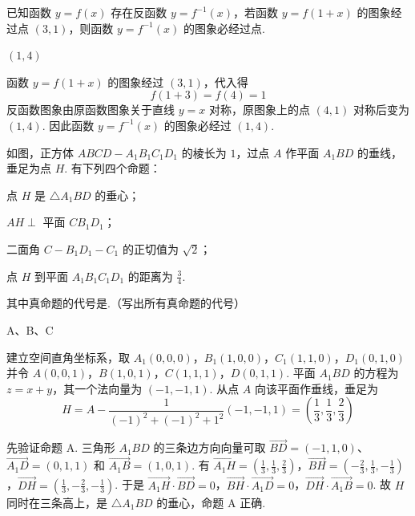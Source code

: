 \begin{problem}
已知函数 \( y = f(x) \) 存在反函数 \( y = f^{-1}(x) \)，若函数 \( y = f(1 + x) \) 的图象经过点 \((3,1)\)，则函数 \( y = f^{-1}(x) \) 的图象必经过点\fillinblank{}.

\begin{answer}
\((1,4)\)
\end{answer}

\begin{solution}
函数 \(y=f(1+x)\) 的图象经过 \((3,1)\)，代入得
\[
f(1+3)=f(4)=1
\]
反函数图象由原函数图象关于直线 \(y=x\) 对称，原图象上的点 \((4,1)\) 对称后变为 \((1,4)\). 因此函数 \(y=f^{-1}(x)\) 的图象必经过 \((1,4)\).
\end{solution}
\end{problem}

\begin{problem}
如图，正方体 \(ABCD-A_{1}B_{1}C_{1}D_{1}\) 的棱长为 \(1\)，过点 \(A\) 作平面 \(A_{1}BD\) 的垂线，垂足为点 \(H\). 有下列四个命题：

\begin{circlelist}
\item 点 \(H\) 是 \(\triangle A_{1}BD\) 的垂心；
\item \(AH \perp\) 平面 \(CB_{1}D_{1}\)；
\item 二面角 \(C - B_{1}D_{1} - C_{1}\) 的正切值为 \(\sqrt{2}\)；
\item 点 \(H\) 到平面 \(A_{1}B_{1}C_{1}D_{1}\) 的距离为 \(\frac{3}{4}\).
\end{circlelist}

其中真命题的代号是\fillinblank{}.（写出所有真命题的代号）


\begin{answer}
A、B、C
\end{answer}

\begin{solution}
建立空间直角坐标系，取
\(A_1(0,0,0)\)，\(B_1(1,0,0)\)，\(C_1(1,1,0)\)，\(D_1(0,1,0)\)
并令
\(A(0,0,1)\)，\(B(1,0,1)\)，\(C(1,1,1)\)，\(D(0,1,1)\).
平面 \(A_1BD\) 的方程为 \(z=x+y\)，其一个法向量为 \((-1,-1,1)\). 从点 \(A\) 向该平面作垂线，垂足为
\[
H=A-\frac{1}{(-1)^2+(-1)^2+1^2}(-1,-1,1)=\left(\frac{1}{3},\frac{1}{3},\frac{2}{3}\right)
\]

先验证命题 A. 三角形 \(A_1BD\) 的三条边方向向量可取 \(\overrightarrow{BD}=(-1,1,0)\)、\(\overrightarrow{A_1D}=(0,1,1)\) 和 \(\overrightarrow{A_1B}=(1,0,1)\). 有
\(\overrightarrow{A_1H}=\left(\frac{1}{3},\frac{1}{3},\frac{2}{3}\right)\)，\(\overrightarrow{BH}=\left(-\frac{2}{3},\frac{1}{3},-\frac{1}{3}\right)\)，\(\overrightarrow{DH}=\left(\frac{1}{3},-\frac{2}{3},-\frac{1}{3}\right)\).
于是
\(\overrightarrow{A_1H}\cdot\overrightarrow{BD}=0\)，\(\overrightarrow{BH}\cdot\overrightarrow{A_1D}=0\)，\(\overrightarrow{DH}\cdot\overrightarrow{A_1B}=0\).
故 \(H\) 同时在三条高上，是 \(\triangle A_1BD\) 的垂心，命题 A 正确.


\end{solution}
\end{problem}

